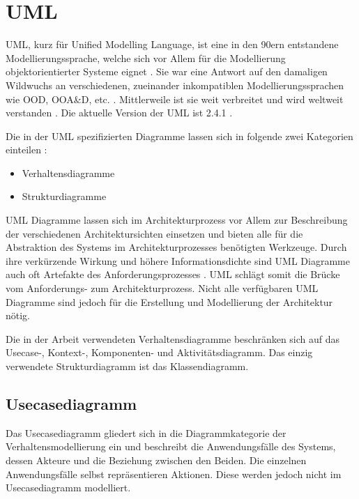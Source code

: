 \section{UML}
UML, kurz für Unified Modelling Language, ist eine in den 90ern entstandene Modellierungssprache, welche sich vor Allem für die Modellierung objektorientierter Systeme eignet \cite[S. 145]{basiswissen}. Sie war eine Antwort auf den damaligen Wildwuchs an verschiedenen, zueinander inkompatiblen Modellierungssprachen wie OOD, OOA\&D, etc. \cite[S. 5]{glasklar}. Mittlerweile ist sie weit verbreitet und wird weltweit verstanden \cite[S. 138]{effektiv}. Die aktuelle Version der UML ist 2.4.1 \cite{omg}.


Die in der UML spezifizierten Diagramme lassen sich in folgende zwei Kategorien einteilen \cite[S. 105, 239]{glasklar}\cite[S. 146]{basiswissen}:

\begin{itemize}
  \item Verhaltensdiagramme
  \item Strukturdiagramme
\end{itemize}

UML Diagramme lassen sich im Architekturprozess vor Allem zur Beschreibung der verschiedenen Architektursichten einsetzen und bieten alle für die Abstraktion des Systems im Architekturprozesses benötigten Werkzeuge\cite[S. 139]{effektiv}. Durch ihre verkürzende Wirkung und höhere Informationsdichte sind UML Diagramme auch oft Artefakte des Anforderungsprozesses \cite[S. 215]{reqman}. UML schlägt somit die Brücke vom Anforderungs- zum Architekturprozess. Nicht alle verfügbaren UML Diagramme sind jedoch für die Erstellung und Modellierung der Architektur nötig. \cite[S. 144]{basiswissen}

Die in der Arbeit verwendeten Verhaltensdiagramme beschränken sich auf das Usecase-, Kontext-, Komponenten- und Aktivitätsdiagramm. Das einzig verwendete Strukturdiagramm ist das Klassendiagramm.


\subsection{Usecasediagramm}
Das Usecasediagramm gliedert sich in die Diagrammkategorie der Verhaltensmodellierung ein und beschreibt die Anwendungsfälle des Systems, dessen Akteure und die Beziehung zwischen den Beiden. Die einzelnen Anwendungsfälle selbst repräsentieren Aktionen. Diese werden jedoch nicht im Usecasediagramm modelliert.\cite[S. 242-245]{glasklar}

